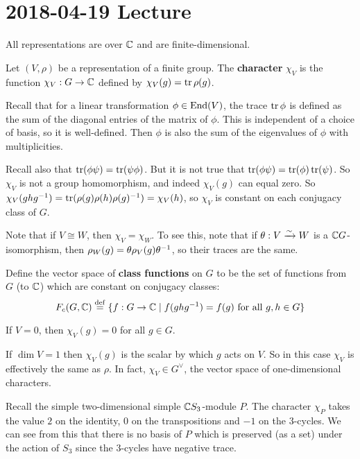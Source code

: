 \section{2018-04-19 Lecture}

\begin{rmk}
	All representations are over $\mathbb{C}$ and are finite-dimensional.
\end{rmk}

\begin{defn}
	Let $(V,\rho)$ be a representation of a finite group.
	The \textbf{character} $\chi_V$ is the function $\chi_V:G \to \mathbb{C}$ defined by $\chi_V(g)= \operatorname{tr}\rho(g)$.
\end{defn}

\begin{rmk}
	Recall that for a linear transformation $\phi \in \operatorname{End}(V)$, the trace $\operatorname{tr}\phi$ is defined as the sum of the diagonal entries of the matrix of $\phi$.
	This is independent of a choice of basis, so it is well-defined.
	Then $\phi$ is also the sum of the eigenvalues of $\phi$ with multiplicities.

	Recall also that $\operatorname{tr}(\phi\psi)=\operatorname{tr}(\psi\phi)$.
	But it is not true that $\operatorname{tr}(\phi\psi)=\operatorname{tr}(\phi)\operatorname{tr}(\psi)$.
	So $\chi_V$ is not a group homomorphism, and indeed $\chi_V(g)$ can equal zero.
	So $\chi_V(ghg^{-1}) = \operatorname{tr}(\rho(g)\rho(h)\rho(g)^{-1}) = \chi_V(h)$, so $\chi_V$ is constant on each conjugacy class of $G$.
	
	Note that if $V \cong W$, then $\chi_V=\chi_W$.
	To see this, note that if $\theta: V \xrightarrow{\sim} W$ is a $\mathbb{C} G$-isomorphism, then $\rho_W(g)=\theta\rho_V(g)\theta^{-1}$, so their traces are the same.
\end{rmk}

\begin{defn}
	Define the vector space of \textbf{class functions} on $G$ to be the set of functions from $G$ (to $\mathbb{C}$) which are constant on conjugacy classes:
	\[F_c(G,\mathbb{C}) \overset{\mathrm{def}}{=} \{f: G \to \mathbb{C} \mid f(ghg^{-1})=f(g) \text{ for all } g,h \in G\}\]
\end{defn}

\begin{exam}\label{12:ex}
	\leavevmode
	\begin{enum}
		\io
		If $V=0$, then $\chi_V(g)=0$ for all $g \in G$.

		\io
		If $\dim V=1$ then $\chi_V(g)$ is the scalar by which $g$ acts on $V$.
		So in this case $\chi_V$ is effectively the same as $\rho$.
		In fact, $\chi_V \in G^\vee$, the vector space of one-dimensional characters.
		
		\io\label{12:s3}
		Recall the simple two-dimensional simple $\mathbb{C} S_3$-module $P$.
		The character $\chi_P$ takes the value $2$ on the identity, $0$ on the transpositions and $-1$ on the $3$-cycles.
		We can see from this that there is no basis of $P$ which is preserved (as a set) under the action of $S_3$ since the $3$-cycles have negative trace.
	\end{enum}
\end{exam}

